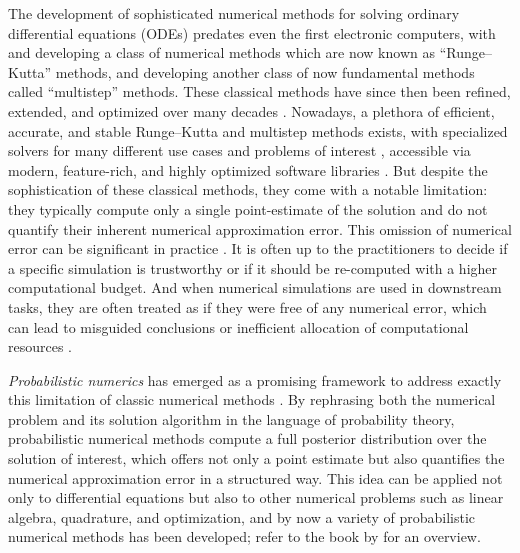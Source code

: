 \documentclass{mimosis}
\begin{document}
The development of sophisticated numerical methods for solving ordinary differential equations (ODEs) predates even the first electronic computers,
with \textcite{Runge1895} and \textcite{kutta1901beitrag} developing a class of numerical methods which are now known as ``Runge--Kutta'' methods,
and \textcite{bashforth1883attempt} developing another class of now fundamental methods called ``multistep'' methods.
These classical methods have since then been refined, extended, and optimized over many decades
\parencite{butcher2016numerical}.
Nowadays, a plethora of efficient, accurate, and stable Runge--Kutta and multistep methods exists, with specialized solvers for many different use cases and problems of interest
\parencite{hairer2008solving,hairer1987solving},
accessible via modern, feature-rich, and highly optimized software libraries
\parencite{rackauckas2017differentialequations,2020SciPy,shampine1997matlab}.
But despite the sophistication of these classical methods, they come with a notable limitation:
they typically compute only a single point-estimate of the solution and do not quantify their inherent numerical approximation error.
This omission of numerical error can be significant in practice
\parencite{higham2002accuracy}.
It is often up to the practitioners to decide if a specific simulation is trustworthy or if it should be re-computed with a higher computational budget.
And when numerical simulations are used in downstream tasks, they are often treated as if they were free of any numerical error, which can lead to misguided conclusions or inefficient allocation of computational resources
\parencite{oberkampf2010verification}.

\emph{Probabilistic numerics} has emerged as a promising framework to address exactly this limitation of classic numerical methods
\parencite{hennig_osborne_kersting_2022,hennig15_probab_numer_uncer_comput,oates2019modern}.
By rephrasing both the numerical problem and its solution algorithm in the language of probability theory, probabilistic numerical methods compute a full posterior distribution over the solution of interest, which offers not only a point estimate but also quantifies the numerical approximation error in a structured way.
This idea can be applied not only to differential equations but also to other numerical problems such as linear algebra, quadrature, and optimization, and by now a variety of probabilistic numerical methods has been developed;
refer to the book by \textcite{hennig_osborne_kersting_2022} for an overview.
\end{document}
